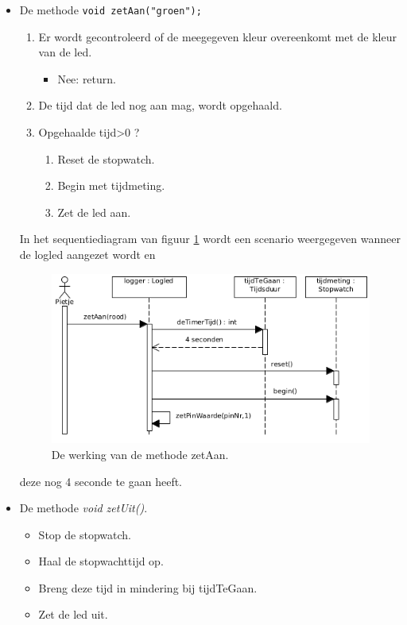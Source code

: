 \begin{itemize}
	\item De methode \texttt{void zetAan("groen");}  
	  \begin{enumerate}
	  	\item Er wordt gecontroleerd of de meegegeven kleur overeenkomt met de kleur van de led.
	  	\begin{itemize}
	  		\item Nee: return.
	  		
	  	\end{itemize}
	  	\item De tijd dat de led nog aan mag, wordt opgehaald.
	  	\item Opgehaalde tijd\textgreater  0 ?
	  		  	\begin{enumerate}
	  		\item Reset de stopwatch.
	  		\item Begin met tijdmeting.
	  		\item Zet de led aan.	  		
	  	\end{enumerate}
	  \end{enumerate}
  In het sequentiediagram van figuur \ref{fig:ll_zetAan} wordt een scenario weergegeven wanneer de logled aangezet wordt en 
      \begin{figure}[h!]
  	\captionsetup{justification=centering}
  	\includegraphics[width=0.8 \linewidth]{figuren/seqZetAan}      %
  \centering
  \caption{De werking van de methode zetAan.}
  \label{fig:ll_zetAan}
\end{figure} 
 deze nog 4 seconde te gaan heeft. 
 \newpage
 \item De methode \textit{ void zetUit()}. 
 \begin{itemize}
 	\item Stop de stopwatch.
 	\item Haal de stopwachttijd op.
 	\item Breng deze tijd in mindering bij tijdTeGaan.
 	\item Zet de led uit.

\end{itemize}
\end{itemize}
